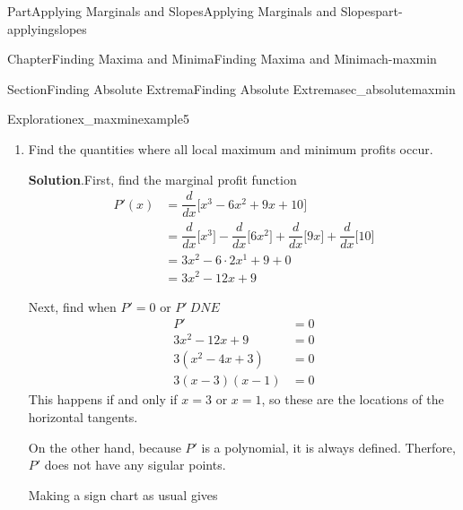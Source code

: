 \documentclass[oneside,10pt,]{tufte-book}
\newcommand{\blocktitlefont}{\relax}
\numberwithin{equation}{chapter}
\newcommand{\ddx}[1]{ \dfrac{d}{dx} \Big[ #1 \Big]  }
\newcommand{\amp}{&}
\begin{document}
\begin{partptx}{Part}{Applying Marginals and Slopes}{}{Applying Marginals and Slopes}{}{}{part-applyingslopes}
\begin{chapterptx}{Chapter}{Finding Maxima and Minima}{}{Finding Maxima and Minima}{}{}{ch-maxmin}
\begin{sectionptx}{Section}{Finding Absolute Extrema}{}{Finding Absolute Extrema}{}{}{sec_absolutemaxmin}
\begin{exploration}{Exploration}{}{ex_maxminexample5}
\begin{enumerate}[font=\bfseries,label=(\alph*),ref=\alph*]
\item{}Find the quantities where all local maximum and minimum profits occur.%
\par\smallskip%
\noindent\textbf{\blocktitlefont Solution}.\hypertarget{ex_maxminexample5-2-2}{}\quad{}First, find the marginal profit function%
\begin{align*}
P'(x) \amp  = \ddx{x^3 - 6x^2 + 9x +10 } \\
\amp = \ddx{x^3} - \ddx{ 6x^2 } + \ddx{ 9x } + \ddx{10}\\
\amp = 3x^2 - 6\cdot 2x^1 + 9 + 0\\
\amp = 3x^2 - 12x + 9
\end{align*}
%
\par
Next, find when \(P'=0\) or \(P'\ DNE\)%
\begin{align*}
P' \amp = 0\\
3x^2 - 12x + 9 \amp =0\\
3(x^2 - 4x + 3) \amp =0\\
3(x-3)(x-1) \amp =0
\end{align*}
This happens if and only if \(x=3\) or \(x=1\), so these are the locations of the horizontal tangents.%
\par
On the other hand, because \(P'\) is a polynomial, it is always defined.  Therfore, \(P'\) does not have any sigular points.%
\par
Making a sign chart as usual gives \begin{image}{0.25}{0.5}{0.25}{}%
\end{image}
\end{enumerate}
\end{exploration}
\end{sectionptx}
\end{chapterptx}
\end{partptx}
\end{document}
